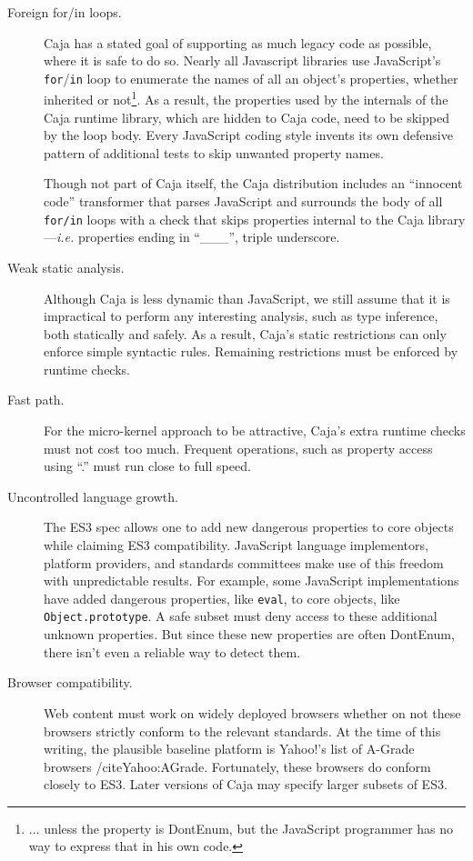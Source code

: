 \documentclass[letterpaper,twocolumn,10pt]{article}
\newcommand{\code}[1]{{\tt {#1}}}              %
\begin{document}
\begin{description}
  \item[Foreign for/in loops.] Caja has a stated goal of supporting as much legacy code as possible, where it
  is safe to do so.  Nearly all Javascript libraries use JavaScript's \code{for}/\code{in} loop to enumerate the names of all an object's 
  properties, whether inherited or not\footnote{
  ... unless the property is DontEnum, but the JavaScript programmer has no way to express that in his own code.
  }. As a result, the properties used by the internals of the Caja runtime library, which are hidden to Caja code, 
  need to be skipped by the loop body. Every JavaScript coding style invents its own defensive pattern of additional 
  tests to skip unwanted property names.
  
  Though not part of Caja itself, the Caja distribution includes an ``innocent code'' transformer that parses JavaScript and
  surrounds the body of all \code{for/in} loops with a check that skips properties internal to the Caja library---\emph{i.e.}
  properties ending in ``\_\_\_'', triple underscore.
    
  \item[Weak static analysis.] Although Caja is less dynamic than JavaScript, we still assume that it is impractical 
  to perform any interesting analysis, such as type inference, both statically and safely. As a result, Caja's static 
  restrictions can only enforce simple syntactic rules. Remaining restrictions must be enforced by runtime checks.
  
  \item[Fast path.] For the micro-kernel approach to be attractive, Caja's extra runtime checks must not cost too 
  much. Frequent operations, such as property access using ``.'' must run close to full speed.
  
  \item[Uncontrolled language growth.] The ES3 spec allows one to add new dangerous properties to core objects while 
  claiming ES3 compatibility. JavaScript language implementors, platform providers, and standards committees make use 
  of this freedom with unpredictable results. For example, some JavaScript implementations have added dangerous 
  properties, like \code{eval}, to core objects, like \code{Object.prototype}. A safe subset must deny access to 
  these additional unknown properties. But since these new properties are often DontEnum, there isn't even a reliable 
  way to detect them.
  
  \item[Browser compatibility.] Web content must work on widely deployed browsers whether on not these browsers 
  strictly conform to the relevant standards. At the time of this writing, the plausible baseline platform is 
  Yahoo!'s list of A-Grade browsers /cite{Yahoo:AGrade}. Fortunately, these browsers do conform closely to ES3. 
  Later versions of Caja may specify larger subsets of ES3.
  

\end{description}
\end{document}
